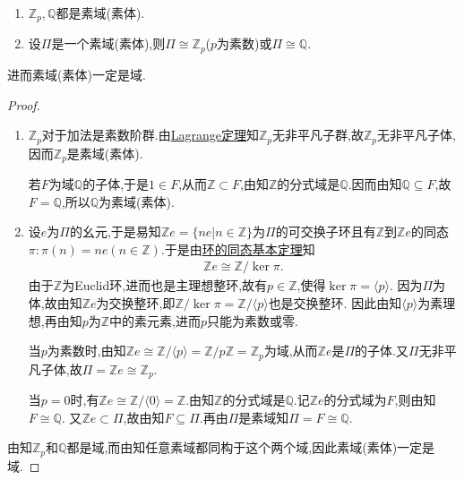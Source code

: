 \documentclass[../../main.tex]{subfiles}%
\begin{document}
\begin{theorem}\label{theorem:抽象代数--定理3.1.1}
\begin{enumerate}[(1)]
\item\label{theorem:抽象代数--定理3.1.1-1} $\mathbb{Z}_p,\mathbb{Q}$都是素域(素体).

\item\label{theorem:抽象代数--定理3.1.1-2} 设$\Pi$是一个素域(素体),则$\Pi\cong\mathbb{Z}_p$($p$为素数)或$\Pi\cong\mathbb{Q}$.
\end{enumerate}
进而素域(素体)一定是域.
\end{theorem}
\begin{proof}
\begin{enumerate}[(1)]
\item $\mathbb{Z}_p$对于加法是素数阶群.由\hyperref[theorem:抽象代数--Lagrange定理]{Lagrange定理}知$\mathbb{Z}_p$无非平凡子群,故$\mathbb{Z}_p$无非平凡子体,因而$\mathbb{Z}_p$是素域(素体).

若$F$为域$\mathbb{Q}$的子体,于是$1\in F$,从而$\mathbb{Z}\subset F$,由知$\mathbb{Z}$的分式域是$\mathbb{Q}$.因而由知$\mathbb{Q}\subseteq F$,故$F=\mathbb{Q}$,所以$\mathbb{Q}$为素域(素体).

\item 设$e$为$\Pi$的幺元,于是易知$\mathbb{Z}e=\{ne|n\in\mathbb{Z}\}$为$\Pi$的可交换子环且有$\mathbb{Z}$到$\mathbb{Z}e$的同态$\pi:\pi(n)=ne(n\in\mathbb{Z})$.于是由\hyperref[theorem:环的同态基本定理]{环的同态基本定理}知
\begin{align*}
\mathbb{Z}e\cong \mathbb{Z}/\ker\pi.
\end{align*}
由于$\mathbb{Z}$为Euclid环,进而也是主理想整环,故有$p\in \mathbb{Z}$,使得$\ker\pi=\langle p\rangle $.
因为$\Pi$为体,故由知$\mathbb{Z}e$为交换整环,即$\mathbb{Z}/\ker\pi=\mathbb{Z}/\langle p\rangle$也是交换整环.
因此由知$\langle p\rangle$为素理想,再由知$p$为$\mathbb{Z}$中的素元素,进而$p$只能为素数或零.

当$p$为素数时,由知$\mathbb{Z}e\cong \mathbb{Z}/\langle p\rangle=\mathbb{Z}/p\mathbb{Z} = \mathbb{Z}_p$为域,从而$\mathbb{Z}e$是$\Pi$的子体.又$\Pi$无非平凡子体,故$\Pi=\mathbb{Z}e\cong\mathbb{Z}_p$.

当$p=0$时,有$\mathbb{Z}e\cong \mathbb{Z}/\langle 0\rangle=\mathbb{Z}$.由知$\mathbb{Z}$的分式域是$\mathbb{Q}$.记$\mathbb{Z}e$的分式域为$F$,则由知$F\cong \mathbb{Q}$.
又$\mathbb{Z}e\subset \Pi$,故由知$F\subseteq \Pi$.再由$\Pi$是素域知$\Pi=F\cong\mathbb{Q}$.
\end{enumerate}
由知$\mathbb{Z}_p$和$\mathbb{Q}$都是域,而由知任意素域都同构于这个两个域,因此素域(素体)一定是域.
\end{proof}
\end{document}
